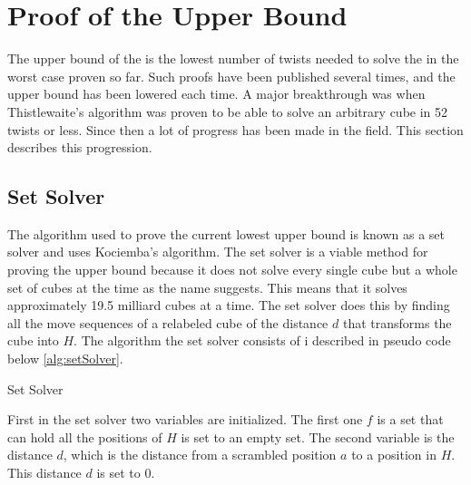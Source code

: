 \chapter{Proof of the Upper Bound}
The upper bound of the \rubik{} is the lowest number of twists needed to solve the \rubik in the worst case proven so far. Such proofs have been published several times, and the upper bound has been lowered each time. A major breakthrough was when Thistlewaite's algorithm was proven to be able to solve an arbitrary cube in 52 twists or less. Since then a lot of progress has been made in the field. This section describes this progression.

\section{Set Solver}
The algorithm used to prove the current lowest upper bound is known as a set solver and uses Kociemba's algorithm. The set solver is a viable method for proving the upper bound because it does not solve every single cube but a whole set of cubes at the time as the name suggests. This means that it solves approximately 19.5 milliard cubes at a time.
The set solver does this by finding all the move sequences of a relabeled cube of the distance $d$ that transforms the cube into $H$. 
The algorithm the set solver consists of i described in pseudo code below \ref{alg:setSolver}.%

\begin{algorithm}[!h]                     
\caption{Set Solver \cite{rokicki09}}          
\label{alg:setSolver}        
\begin{algorithmic}[1]
				\ENDIF
			\ENDFOR
		\ENDIF
		\ENDIF
	\ENDIF
\ENDWHILE
\end{algorithmic}
\end{algorithm}

First in the set solver two variables are initialized. The first one $f$ is a set that can hold all the positions of $H$ is set to an empty set. The second variable is the distance $d$, which is the distance from a scrambled position $a$ to a position in $H$. This distance $d$ is set to $0$.

